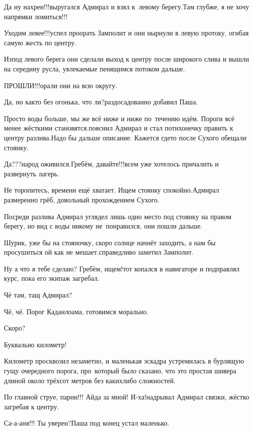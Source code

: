 \diagdash Да ну нахрен!!!\mdash выругался Адмирал и взял к~левому берегу.\mdash Там глубже, я не хочу напрямки ломиться!!!

\diagdash Уходим левее!!!\mdash успел проорать Замполит и они нырнули в левую протоку, огибая самую жесть по центру.

Из\sdash под левого берега они сделали выход к центру после широкого слива и вышли на середину русла, увлекаемые пенящимся потоком дальше.

\diagdash ПРОШЛИ!!!\mdash орали они на всю округу.

\diagdash Да, но как\sdash то без огонька, что ли?\mdash раздосадованно добавил Паша.

\diagdash Просто воды больше, мы же всё ниже и ниже по~течению идём. Пороги всё менее жёсткими становятся.\mdash пояснил Адмирал и стал потихонечку править к центру разлива.\mdash Надо бы дальше описание. Кажется где\sdash то после Сухого обещали стоянку.

\diagdash Да???\mdash народ оживился.\mdash Гребём, давайте!!!\mdash всем уже хотелось причалить и развернуть лагерь.

\diagdash Не торопитесь, времени ещё хватает. Ищем стоянку спокойно.\mdash Адмирал размеренно грёб, довольный прохождением Сухого.

Посреди разлива Адмирал углядел лишь одно место под стоянку на правом берегу, но вид с воды никому не~понравился, они пошли дальше.

\diagdash Шурик, уже бы на стояночку, скоро солнце начнёт заходить, а нам бы просушиться ой как не мешает.\mdash справедливо заметил Замполит.

\diagdash Ну а что я тебе сделаю? Гребём, ищем!\mdash тот копался в навигаторе и подправлял курс, пока его экипаж загребал.

\diagdash Чё там, тащ Адмирал?

\diagdash Чё, чё. Порог Каданлоама, готовимся морально.

\diagdash Скоро? 

\diagdash Буквально километр!

Километр просквозил незаметно, и маленькая эскадра устремилась в бурлящую гущу очередного порога, про~который было сказано, что это простая шивера длиной около трёхсот метров без каких\sdash либо сложностей.

\diagdash По главной струе, парни!!! Айда за мной! И-ха!\mdash надрывал Адмирал связки, жёстко загребая к центру.

\diagdash Са-а-аня!!! Ты уверен?\mdash Паша под конец устал маленько.

